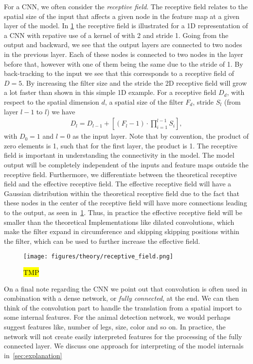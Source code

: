 For a \acrshort{CNN}, we often consider the \textit{receptive field}. The
receptive field relates to the spatial size of the input that affects a given
node in the feature map at a given layer of the model. In
\cref{fig:receptive_field} the receptive field is illustrated for a 1D
representation of a \acrshort{CNN} with repative use of a kernel of with 2 and  stride 1. Going from the output and backward, we see that the output layers are connected to two nodes in the previous layer. Each of these nodes is connected to two nodes in the layer before that, however with one of them being the same due to the stride of 1. By back-tracking to the input we see that this
corresponds to a receptive field of $D = 5$. By increasing the filter size and
the stride the 2D receptive field will grow a lot faster than shown in this
simple 1D example. For a receptive field $D_d$, with respect to the spatial dimension $d$, a
spatial size of the filter $F_d$, stride $S_l$ (from layer $l-1$ to $l$) we have
\begin{align*}
    D_l = D_{l-1} + \left[(F_l - 1) \cdot \prod_{i=1}^{l-1}S_i \right],
\end{align*}
with $D_0 = 1$ and $l=0$ as the input layer. Note that by convention, the
product of zero elements is 1, such that for the first layer, the product is 1. The receptive field is important in understanding the connectivity in the model. The model output will be completely independent of the inputs and feature maps outside the receptive field. Furthermore, we differentiate between the theoretical
receptive field and the effective receptive field. The effective receptive field
will have a Gaussian distribution within the theoretical receptive field due to the fact that these nodes in the center of the receptive field will have more connections leading to the output, as seen in~\cref{fig:receptive_field}. Thus, in practice the effective receptive field will be smaller than the theoretical Implementations like dilated convolutions, which make the filter expand in circumference and skipping skipping positions within the filter, which can be used to further increase the effective field. 

\begin{figure}[H]
  \centering
  \texttt{[image: figures/theory/receptive\_field.png]}
  \caption{\hl{TMP}}
  \label{fig:receptive_field}
\end{figure}


On a final note regarding the \acrshort{CNN} we point out that convolution is often used in combination with a dense network, or \textit{fully connected}, at the end. We can then think of the convolution part to handle the translation from a spatial import to some internal features. For the animal detection network, we would perhaps suggest features like, number of legs, size, color and so on. In practice, the network will not create easily interpreted features for the processing of the fully connected layer. We discuss one approach for interpreting of the model internals in~\cref{sec:explanation}

